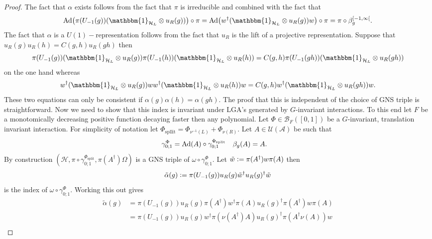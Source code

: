 \documentclass[12pt,a4paper,twoside]{article}
\newcommand{\defeq}{\vcentcolon=}
\let\originalleft\left
\let\originalright\right
\renewcommand{\left}{\mathopen{}\mathclose\bgroup\originalleft}
\renewcommand{\right}{\aftergroup\egroup\originalright}
\newcommand{\UU}{\mathcal U}
\newcommand{\BB}{\mathcal B}
\newcommand{\HH}{\mathcal H}
\renewcommand{\AA}{\mathcal A}
\newcommand{\id}{\mathbbm{1}}
\newcommand{\Ad}[1]{\textrm{Ad}\left(#1\right)}
\theoremstyle{definition}
\numberwithin{equation}{section}
\begin{document}
\begin{proof}
	The fact that $\alpha$ exists follows from the fact that $\pi$ is irreducible and combined with the fact that
	\begin{equation}
		\Ad{\pi(U_{-1}(g)) (\id_{\HH_L}\otimes u_R(g))}\circ\pi=\Ad{w^\dagger(\id_{\HH_L}\otimes u_R(g)) w}\circ\pi=\pi\circ\beta_g^{[-1,\infty[}.
	\end{equation}
	The fact that $\alpha$ is a $U(1)-$representation follows from the fact that $u_R$ is the lift of a projective representation. Suppose that $u_R(g)u_R(h)=C(g,h)u_R(gh)$ then
	\begin{equation}
		\pi(U_{-1}(g)) (\id_{\HH_L}\otimes u_R(g))\pi(U_{-1}(h)) (\id_{\HH_L}\otimes u_R(h))=C(g,h)\pi(U_{-1}(gh)) (\id_{\HH_L}\otimes u_R(gh))
	\end{equation}
	on the one hand whereas
	\begin{equation}
		w^\dagger(\id_{\HH_L}\otimes u_R(g)) ww^\dagger(\id_{\HH_L}\otimes u_R(h)) w=C(g,h)w^\dagger(\id_{\HH_L}\otimes u_R(gh)) w.
	\end{equation}
	These two equations can only be consistent if $\alpha(g)\alpha(h)=\alpha(gh)$. The proof that this is independent of the choice of GNS triple is straightforward. Now we need to show that this index is invariant under LGA's generated by $G$-invariant interactions. To this end let $F$ be a monotomically decreasing positive function decaying faster then any polynomial. Let $\Phi\in\BB_F([0,1])$ be a $G$-invariant, translation invariant interaction. For simplicity of notation let $\Phi_{\text{spllit}}=\Phi_{\nu^{-1}(L)}+\Phi_{\nu(R)}$. Let $A\in\UU(\AA)$ be such that
	\begin{align}\label{eq:DefinitionSplitting1DAppendix}
		\gamma^\Phi_{0;1}&=\Ad{A}\circ\gamma^{\Phi_{\text{split}}}_{0;1}&\beta_g(A)&=A.
	\end{align}
	By construction $(\HH,\pi\circ\gamma^{\Phi_{\text{split}}}_{0;1},\pi(A^\dagger)\Omega)$ is a GNS triple of $\omega\circ\gamma^\Phi_{0;1}$. Let $\tilde{w}\defeq \pi(A^\dagger)w\pi(A)$ then
	\begin{equation}
		\tilde{\alpha}(g)\defeq \pi(U_{-1}(g))u_R(g)\tilde{w}^\dagger u_R(g)^\dagger \tilde{w}
	\end{equation}
	is the index of $\omega\circ\gamma^\Phi_{0;1}$. Working this out gives
	\begin{align}
		\tilde{\alpha}(g)&=\pi(U_{-1}(g))u_R(g)\pi(A^\dagger)w^\dagger\pi(A)u_R(g)^\dagger\pi(A^\dagger)w\pi(A)\\
		&=\pi(U_{-1}(g))u_R(g)w^\dagger \pi(\nu(A^\dagger)A)u_R(g)^\dagger\pi(A^\dagger\nu(A))w\\

\end{align}
\end{proof}
\end{document}
